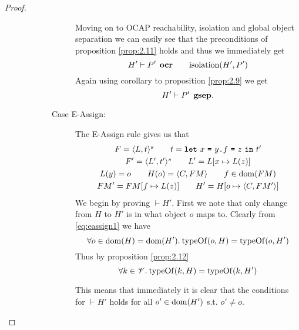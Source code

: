 \begin{proof}
\begin{description}
\begin{description}
\begin{description}
              Moving on to OCAP reachability, isolation and global object
              separation we can easily see that the preconditions of proposition
              \ref{prop:2.11} holds and thus we immediately get
              \begin{equation*}
                H' \vdash P' \:\: \mbox{\bf ocr} \quad\quad \mbox{$\mathrm{isolation}$}(H', P')
              \end{equation*}
              Again using corollary to proposition \ref{prop:2.9} we get
              \begin{equation*}
                H' \vdash P' \:\: \mbox{\bf gsep}.
              \end{equation*}


            \item[Case {\sc E-Assign}:] The {\sc E-Assign} rule gives us that
              \begin{equation} \label{eq:eassign1}
                \begin{gathered}
                  F = \mbox{$\langle L, t \rangle^s$} \quad\quad t = \mbox{\texttt{let}~$x$~\texttt{=}~$\mbox{$y$\texttt{.}$f$~\texttt{=}~$z$}$~\texttt{in}~$t'$} \\
                  F' = \mbox{$\langle L', t' \rangle^s$} \quad\quad L' = L[x \mapsto L(z)] \\
                  L(y) = o \quad\quad H(o) = \mbox{$\langle C, FM \rangle$} \quad\quad f \in \mbox{$\mathrm{dom}$}(FM)
                  \\
                  FM' = FM[f \mapsto L(z)] \quad\quad H' = H[o \mapsto \mbox{$\langle C, FM' \rangle$}]
                \end{gathered}
              \end{equation}
              We begin by proving $\vdash H'$. First we note
              that only change from $H$ to $H'$ is in what object $o$ maps to.
              Clearly from \eqref{eq:eassign1} we have
              \begin{equation} \label{eq:eassign2}
                \forall o \in \mbox{$\mathrm{dom}$}(H) = \mbox{$\mathrm{dom}$}(H'). \: \mbox{$\mathrm{typeOf}$}(o, H) = \mbox{$\mathrm{typeOf}$}(o,
                H')
              \end{equation}
              Thus by proposition \ref{prop:2.12} 
              \begin{equation} \label{eq:eassign3}
                \forall k \in \mathscr{V}. \: \mbox{$\mathrm{typeOf}$}(k, H) = \mbox{$\mathrm{typeOf}$}(k,
                H')
              \end{equation}

              \begin{addmargin}[1em]{1em}
                \begin{remark}
                  This means that immediately it is clear that the conditions for
                  $\vdash H'$ holds for all $o' \in \mbox{$\mathrm{dom}$}(H')$ s.t. $o' \neq o$.
                \end{remark}
              \end{addmargin}


\end{description}
\end{description}
\end{description}
\end{proof}
